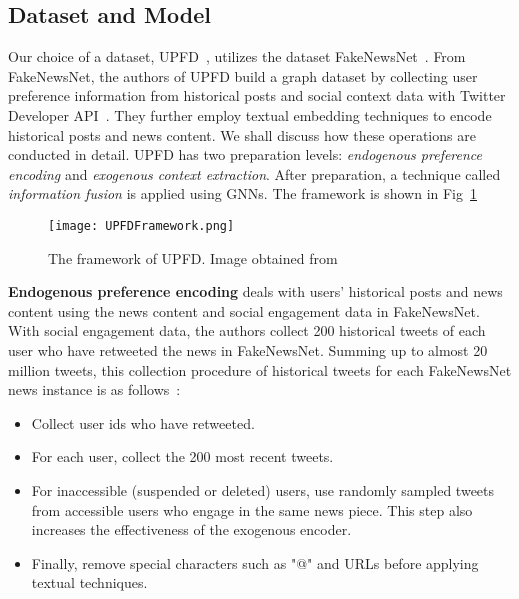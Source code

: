 \subsection{Dataset and Model}
\label{subsec:mixedApproaches_DatasetAndModel}
Our choice of a dataset, UPFD~\parencite{UPFD_Dataset_Shu}, utilizes the dataset FakeNewsNet~\parencite{FakeNewsNet_Shu}. From FakeNewsNet, the authors of UPFD build a graph dataset by collecting user preference information from historical posts and social context data with Twitter Developer API~\parencite{TwitterAPI_Twitter}. They further employ textual embedding techniques to encode historical posts and news content. We shall discuss how these operations are conducted in detail. UPFD has two preparation levels: \emph{endogenous preference encoding} and \emph{exogenous context extraction}. After preparation, a technique called \emph{information fusion} is applied using GNNs. The framework is shown in Fig~\ref{fig:UPFD_Framework}\\
\begin{figure}
    \centering
    \texttt{[image: UPFDFramework.png]}
    \caption[UPFD Framework]{The framework of UPFD. Image obtained from~\parencite{UPFD_Dataset_Shu}}
    \label{fig:UPFD_Framework}
\end{figure}
\textbf{Endogenous preference encoding} deals with users' historical posts and news content using the news content and social engagement data in FakeNewsNet. With social engagement data, the authors collect 200 historical tweets of each user who have retweeted the news in FakeNewsNet. Summing up to almost 20 million tweets, this collection procedure of historical tweets for each FakeNewsNet news instance is as follows~\parencite{UPFD_Dataset_Shu}:
\begin{itemize}
    \item Collect user ids who have retweeted.
    \item For each user, collect the 200 most recent tweets.
    \item For inaccessible (suspended or deleted) users, use randomly sampled tweets from accessible users who engage in the same news piece. This step also increases the effectiveness of the exogenous encoder.
    \item  Finally, remove special characters such as "@" and URLs before applying textual techniques.
\end{itemize}
